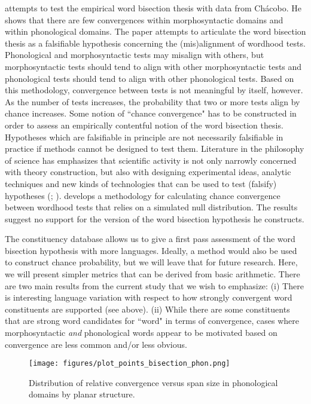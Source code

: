 \documentclass[output=paper,draftmode]{langscibook}
\begin{document}
\citet{tallmanconstituency2021} attempts to test the empirical word bisection thesis with data from Chácobo. He shows that there are few convergences within morphosyntactic domains and within phonological domains. The paper attempts to articulate the word bisection thesis as a falsifiable hypothesis concerning the (mis)align\-ment of wordhood tests. Phonological and morphosyntactic tests may misalign with others, but morphosyntactic tests should tend to align with other morpho\-syn\-tactic tests and phonological tests should tend to align with other phonological tests. Based on this methodology, convergence between tests is not meaningful by itself, however. As the number of tests increases, the probability that two or more tests align by chance increases. Some notion of ``chance convergence" has to be constructed in order to assess an empirically contentful notion of the word bisection thesis.
Hypotheses which are falsifiable in principle are not necessarily falsifiable in practice if methods cannot be designed to test them. Literature in the philosophy of science has emphasizes that scientific activity is not only narrowly concerned with theory construction, but also with designing experimental ideas, analytic techniques and new kinds of technologies that can be used to test (falsify) hypotheses (\citealt[214]{hacking1983representing}; \citealt{mayo2018statistical}). \citet{tallmanconstituency2021} develops a methodology for calculating chance convergence between wordhood tests that relies on a simulated null distribution. The results suggest no support for the version of the word bisection hypothesis he constructs.

The constituency database allows us to give a first pass assessment of the word bisection hypothesis with more languages. Ideally, a method would also be used to construct chance probability, but we will leave that for future research. Here, we will present simpler metrics that can be derived from basic arithmetic. There are two main results from the current study that we wish to emphasize: (i) There is interesting language variation with respect to how strongly convergent word constituents are supported (see  above). (ii) While there are some constituents that are strong word candidates for ``word" in terms of convergence, cases where morphosyntactic \textit{and} phonological words appear to be motivated based on convergence are less common and/or less obvious.

\begin{figure}
    \texttt{[image: figures/plot\_points\_bisection\_phon.png]}
    \caption{Distribution of relative convergence versus span size in phonological domains by planar structure.}
    \label{fig:bisection-phon}
\end{figure}
\end{document}
